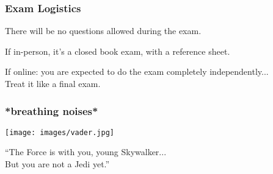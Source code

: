 \begin{frame}
\frametitle{Exam Logistics}
There will be no questions allowed during the exam.

If in-person, it's a closed book exam, with a reference sheet.

If online: you are expected to do the exam completely independently...\\
\quad Treat it like a final exam.


\end{frame}



\begin{frame}
\frametitle{*breathing noises*}

\begin{center}
	\texttt{[image: images/vader.jpg]}
\end{center}

``The Force is with you, young Skywalker...\\
\quad But you are not a Jedi yet.''


\end{frame}




